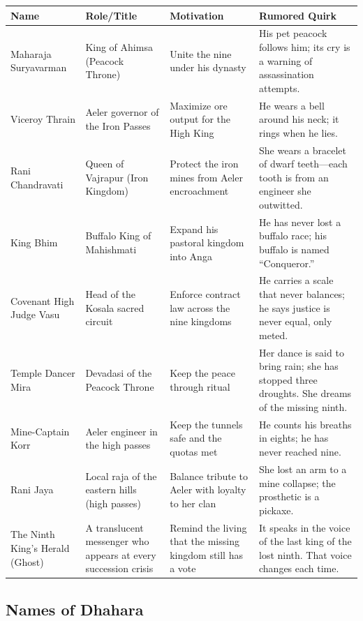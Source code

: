 \begin{longtable}{|p{}|p{}|p{}|p{}|}
\hline
\textbf{Name} & \textbf{Role/Title} & \textbf{Motivation} & \textbf{Rumored Quirk} \\
\hline
Maharaja Suryavarman & King of Ahimsa (Peacock Throne) & Unite the nine under his dynasty & His pet peacock follows him; its cry is a warning of assassination attempts. \\
\hline
Viceroy Thrain & Aeler governor of the Iron Passes & Maximize ore output for the High King & He wears a bell around his neck; it rings when he lies. \\
\hline
Rani Chandravati & Queen of Vajrapur (Iron Kingdom) & Protect the iron mines from Aeler encroachment & She wears a bracelet of dwarf teeth---each tooth is from an engineer she outwitted. \\
\hline
King Bhim & Buffalo King of Mahishmati & Expand his pastoral kingdom into Anga & He has never lost a buffalo race; his buffalo is named ``Conqueror.'' \\
\hline
Covenant High Judge Vasu & Head of the Kosala sacred circuit & Enforce contract law across the nine kingdoms & He carries a scale that never balances; he says justice is never equal, only meted. \\
\hline
Temple Dancer Mira & Devadasi of the Peacock Throne & Keep the peace through ritual & Her dance is said to bring rain; she has stopped three droughts. She dreams of the missing ninth. \\
\hline
Mine-Captain Korr & Aeler engineer in the high passes & Keep the tunnels safe and the quotas met & He counts his breaths in eights; he has never reached nine. \\
\hline
Rani Jaya & Local raja of the eastern hills (high passes) & Balance tribute to Aeler with loyalty to her clan & She lost an arm to a mine collapse; the prosthetic is a pickaxe. \\
\hline
The Ninth King's Herald (Ghost) & A translucent messenger who appears at every succession crisis & Remind the living that the missing kingdom still has a vote & It speaks in the voice of the last king of the lost ninth. That voice changes each time. \\
\hline
\end{longtable}

\subsection*{Names of Dhahara}
\label{sec:dhahara-names}

